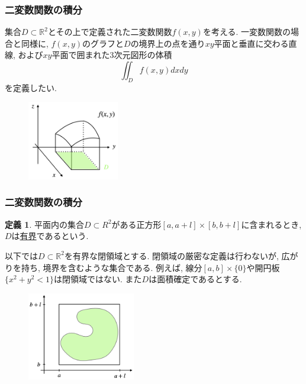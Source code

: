 \documentclass[dvipdfmx,cjk,10.2pt]{beamer}
\newcommand{\R}{\mathbb{R}}
\theoremstyle{definition}
\newtheorem{Def}[Thm]{定義}
\begin{document}
\begin{frame}
\frametitle{二変数関数の積分}


集合$D \subset \R^2$とその上で定義された二変数関数$f(x,y)$を考える. 
一変数関数の場合と同様に, $f(x,y)$のグラフと$D$の境界上の点を通り$xy$平面と垂直に交わる直線, および$xy$平面で囲まれた3次元図形の体積
$$
\iint_Df(x,y)dxdy
$$
を定義したい.  

\vspace{-5mm}
\begin{figure}[htbp]
 \begin{center} 
  \includegraphics[width=40mm]{volume.png}
 \end{center}
\end{figure}


\end{frame}






\begin{frame}
\frametitle{二変数関数の積分}


\begin{Def}
平面内の集合$D \subset R^2$がある正方形$[a,a+l]\times [b,b+l]$に含まれるとき, $D$は\underline{有界}であるという. 
\end{Def}

以下では$D\subset \R^2$を有界な閉領域とする. 
閉領域の厳密な定義は行わないが, 広がりを持ち, 境界を含むような集合である. 
例えば, 線分$[a,b] \times \{0\}$や開円板$\{x^2+y^2<1\}$は閉領域ではない. 
また$D$は面積確定であるとする. 
\vspace{-5mm}

\begin{figure}[htbp]
 \begin{center} 
  \includegraphics[width=47mm]{bdd_domain.png}
 \end{center}
\end{figure}

\end{frame}
\end{document}
